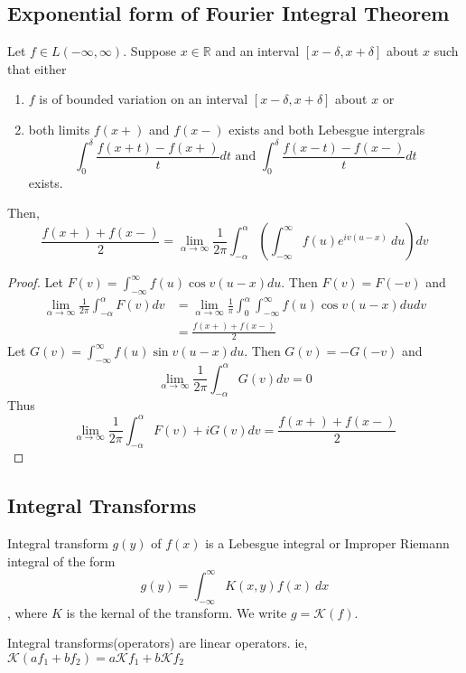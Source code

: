 \subsection{Exponential form of Fourier Integral Theorem}
Let \( f \in L(-\infty,\infty) \).
Suppose \( x \in \mathbb{R} \) and an interval $[x-\delta,x+\delta]$ about $x$ such that either 
\begin{enumerate}
	\item $f$ is of bounded variation on an interval $[x-\delta,x+\delta]$ about $x$ or
	\item both limits $f(x+)$ and $f(x-)$ exists and both Lebesgue intergrals
	\[ \int_0^\delta \frac{f(x+t)-f(x+)}{t} dt \text{ and }\int_0^\delta \frac{f(x-t)-f(x-)}{t} dt \] exists.
\end{enumerate}
Then, \[ \frac{f(x+)+f(x-)}{2} = \lim_{\alpha \to \infty} \frac{1}{2\pi} \int_{-\alpha}^\alpha \left( \int_{-\infty}^\infty f(u) e^{iv(u-x)}\ du\right) dv \]
\begin{proof}
Let \( F(v) = \int_{-\infty}^\infty f(u) \cos v(u-x) du \).
Then \( F(v) = F(-v) \) and 
\begin{align*}
	\lim_{\alpha \to \infty} \frac{1}{2\pi} \int_{-\alpha}^\alpha F(v) dv
	& = \lim_{\alpha \to \infty} \frac{1}{\pi} \int_0^\alpha \int_{-\infty}^\infty f(u) \cos v(u-x) du dv\\
	& = \frac{f(x+)+f(x-)}{2}
\end{align*}
Let \( G(v) = \int_{-\infty}^\infty f(u) \sin v(u-x) du \).
Then \( G(v) = -G(-v) \) and
\[ \lim_{\alpha \to \infty} \frac{1}{2\pi} \int_{-\alpha}^\alpha G(v) dv = 0 \]
Thus \[ \lim_{\alpha \to \infty} \frac{1}{2\pi} \int_{-\alpha}^\alpha F(v) + iG(v) dv = \frac{f(x+)+f(x-)}{2} \]
\end{proof}

\subsection{Integral Transforms}
\begin{definition}
	Integral transform $g(y)$ of $f(x)$ is a Lebesgue integral or Improper Riemann integral of the form
	\[ g(y) = \int_{-\infty}^\infty K(x,y) f(x)\ dx \], where $K$ is the kernal of the transform.
	We write \( g = \mathscr{K}(f) \).
\end{definition}

\begin{remark}
	Integral transforms(operators) are linear operators.
	 ie, \( \mathscr{K}(af_1 + bf_2) = a\mathscr{K}f_1 + b\mathscr{K}f_2 \)
\end{remark}

